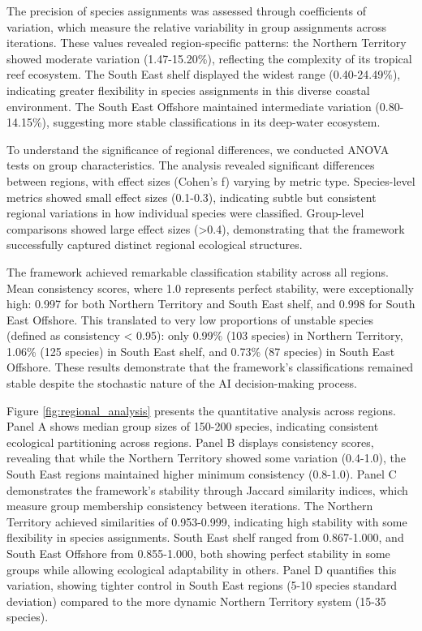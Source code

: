 The precision of species assignments was assessed through coefficients of variation, which measure the relative variability in group assignments across iterations. These values revealed region-specific patterns: the Northern Territory showed moderate variation (1.47-15.20\%), reflecting the complexity of its tropical reef ecosystem. The South East shelf displayed the widest range (0.40-24.49\%), indicating greater flexibility in species assignments in this diverse coastal environment. The South East Offshore maintained intermediate variation (0.80-14.15\%), suggesting more stable classifications in its deep-water ecosystem.

To understand the significance of regional differences, we conducted ANOVA tests on group characteristics. The analysis revealed significant differences between regions, with effect sizes (Cohen's f) varying by metric type. Species-level metrics showed small effect sizes (0.1-0.3), indicating subtle but consistent regional variations in how individual species were classified. Group-level comparisons showed large effect sizes (>0.4), demonstrating that the framework successfully captured distinct regional ecological structures.

The framework achieved remarkable classification stability across all regions. Mean consistency scores, where 1.0 represents perfect stability, were exceptionally high: 0.997 for both Northern Territory and South East shelf, and 0.998 for South East Offshore. This translated to very low proportions of unstable species (defined as consistency < 0.95): only 0.99\% (103 species) in Northern Territory, 1.06\% (125 species) in South East shelf, and 0.73\% (87 species) in South East Offshore. These results demonstrate that the framework's classifications remained stable despite the stochastic nature of the AI decision-making process.

Figure \ref{fig:regional_analysis} presents the quantitative analysis across regions. Panel A shows median group sizes of 150-200 species, indicating consistent ecological partitioning across regions. Panel B displays consistency scores, revealing that while the Northern Territory showed some variation (0.4-1.0), the South East regions maintained higher minimum consistency (0.8-1.0). Panel C demonstrates the framework's stability through Jaccard similarity indices, which measure group membership consistency between iterations. The Northern Territory achieved similarities of 0.953-0.999, indicating high stability with some flexibility in species assignments. South East shelf ranged from 0.867-1.000, and South East Offshore from 0.855-1.000, both showing perfect stability in some groups while allowing ecological adaptability in others. Panel D quantifies this variation, showing tighter control in South East regions (5-10 species standard deviation) compared to the more dynamic Northern Territory system (15-35 species).


